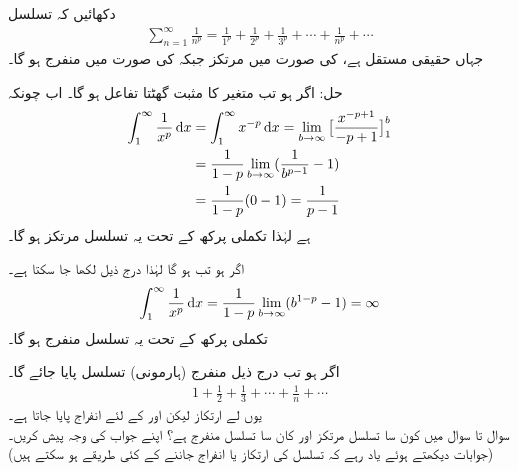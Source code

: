 دکھائیں کہ  تسلسل
\begin{align}
\sum_{n=1}^{\infty}\frac{1}{n^p}=\frac{1}{1^p}+\frac{1}{2^p}+\frac{1}{3^p}+\cdots+\frac{1}{n^p}+\cdots
\end{align}
جہاں  حقیقی مستقل ہے،  کی صورت میں مرتکز جبکہ  کی صورت میں منفرج ہو گا۔

حل:\quad
اگر  ہو تب  متغیر  کا مثبت گھٹتا تفاعل ہو گا۔ اب چونکہ
\begin{align*}
\int_1^{\infty}\frac{1}{x^p}\dif x&=\int_1^{\infty}x^{-p}\dif x=\lim_{b\to\infty}\big[\frac{x^{-p+1}}{-p+1}\big]_1^b\\
&=\frac{1}{1-p}\lim_{b\to\infty}(\frac{1}{b^{p-1}}-1)\\
&=\frac{1}{1-p}(0-1)=\frac{1}{p-1}
\end{align*}
ہے لہٰذا تکملی پرکھ کے تحت یہ تسلسل مرتکز ہو گا۔

اگر ہو تب  ہو گا لہٰذا درج ذیل لکھا جا سکتا ہے۔
\begin{align*}
\int_1^{\infty}\frac{1}{x^p}\dif x=\frac{1}{1-p}\lim_{b\to\infty}(b^{1-p}-1)=\infty
\end{align*}
تکملی پرکھ کے تحت یہ تسلسل منفرج ہو گا۔

اگر  ہو تب درج ذیل منفرج (ہارمونی) تسلسل پایا جائے گا۔
\begin{align*}
1+\frac{1}{2}+\frac{1}{3}+\cdots+\frac{1}{n}+\cdots
\end{align*} 
یوں  لے ارتکاز  لیکن  اور  کے لئے انفراج پایا جاتا ہے۔
\\
سوال  تا سوال  میں کون سا تسلسل مرتکز اور کان سا تسلسل منفرج ہے؟ اپنے جواب کی وجہ پیش کریں۔(جوابات دیکھتے ہوئے یاد رہے کہ تسلسل کی ارتکاز یا انفراج جاننے کے کئی طریقے ہو سکتے ہیں)

